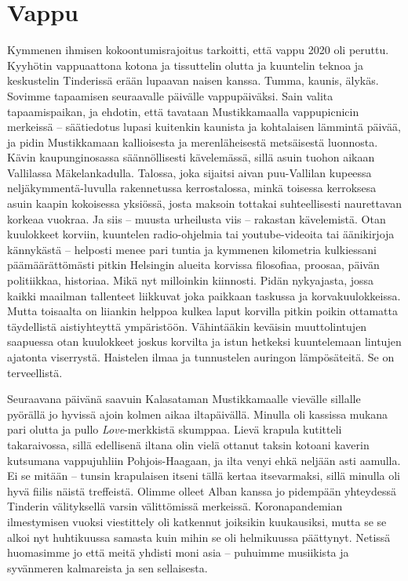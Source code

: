 \documentclass{tsnovel}
\begin{document}
\section{Vappu}

Kymmenen ihmisen kokoontumisrajoitus tarkoitti, että vappu 2020 oli peruttu. Kyyhötin vappuaattona kotona ja tissuttelin olutta ja kuuntelin teknoa ja keskustelin Tinderissä erään lupaavan naisen kanssa. Tumma, kaunis, älykäs. Sovimme tapaamisen seuraavalle päivälle vappupäiväksi. Sain valita tapaamispaikan, ja ehdotin, että tavataan Mustikkamaalla vappupicnicin merkeissä – säätiedotus lupasi kuitenkin kaunista ja kohtalaisen lämmintä päivää, ja pidin Mustikkamaan kallioisesta ja merenläheisestä metsäisestä luonnosta. Kävin kaupunginosassa säännöllisesti kävelemässä, sillä asuin tuohon aikaan Vallilassa Mäkelankadulla. Talossa, joka sijaitsi aivan puu-Vallilan kupeessa neljäkymmentä-luvulla rakennetussa kerrostalossa, minkä toisessa kerroksesa asuin kaapin kokoisessa yksiössä, josta maksoin tottakai suhteellisesti naurettavan korkeaa vuokraa. Ja siis – muusta urheilusta viis – rakastan kävelemistä. Otan kuulokkeet korviin, kuuntelen radio-ohjelmia tai youtube-videoita tai äänikirjoja kännykästä – helposti menee pari tuntia ja kymmenen kilometria kulkiessani päämäärättömästi pitkin Helsingin alueita korvissa  filosofiaa, proosaa, päivän politiikkaa, historiaa. Mikä nyt milloinkin kiinnosti. Pidän nykyajasta, jossa kaikki maailman tallenteet liikkuvat joka paikkaan taskussa ja korvakuulokkeissa. Mutta toisaalta on liiankin helppoa kulkea laput korvilla pitkin poikin ottamatta täydellistä aistiyhteyttä ympäristöön. Vähintääkin keväisin muuttolintujen saapuessa otan kuulokkeet joskus korvilta ja istun hetkeksi kuuntelemaan lintujen ajatonta viserrystä. Haistelen ilmaa ja tunnustelen auringon lämpösäteitä. Se on terveellistä.

Seuraavana päivänä saavuin Kalasataman Mustikkamaalle vievälle sillalle pyörällä jo hyvissä ajoin kolmen aikaa iltapäivällä. Minulla oli kassissa mukana pari olutta ja pullo \textit{Love}-merkkistä skumppaa. Lievä krapula kutitteli takaraivossa, sillä edellisenä iltana olin vielä ottanut taksin kotoani kaverin kutsumana vappujuhliin Pohjois-Haagaan, ja ilta venyi ehkä neljään asti aamulla. Ei se mitään – tunsin krapulaisen itseni tällä kertaa itsevarmaksi, sillä minulla oli hyvä fiilis näistä treffeistä. Olimme olleet Alban kanssa jo pidempään yhteydessä Tinderin välityksellä varsin välittömissä merkeissä. Koronapandemian ilmestymisen vuoksi viestittely oli katkennut joiksikin kuukausiksi, mutta se se alkoi nyt huhtikuussa samasta kuin mihin se oli helmikuussa päättynyt. Netissä huomasimme jo että meitä yhdisti moni asia – puhuimme musiikista ja syvänmeren kalmareista ja sen sellaisesta.
\end{document}
